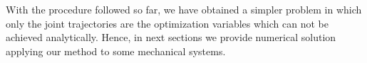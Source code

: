 \begin{enumerate}
\end{enumerate}

With the procedure followed so far, we 
have obtained a simpler problem in which only the joint trajectories are the optimization variables which can not be achieved analytically. Hence, in next sections we provide numerical solution applying our method to some mechanical systems. 


